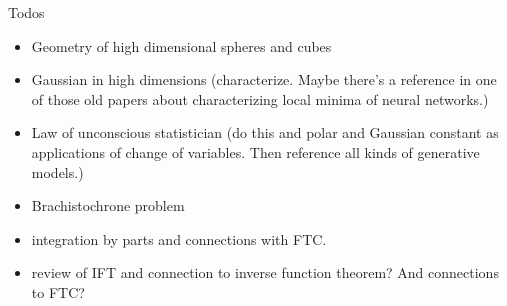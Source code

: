 Todos
\begin{itemize}
  \item Geometry of high dimensional spheres and cubes
  \item Gaussian in high dimensions (characterize. Maybe there's a reference in one of those old papers about characterizing local minima of neural networks.) 
  \item Law of unconscious statistician (do this and polar and Gaussian constant as applications of change of variables. Then reference all kinds of generative models.) 
  \item Brachistochrone problem
  \item integration by parts and connections with FTC.
  \item review of IFT and connection to inverse function theorem? And connections to FTC?
\end{itemize}

